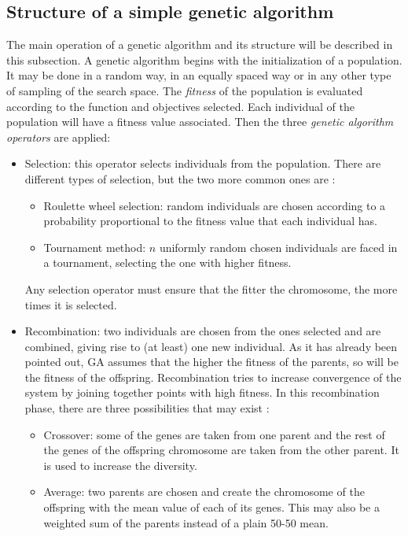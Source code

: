 \subsection{Structure of a simple genetic algorithm}
    
    The main operation of a genetic algorithm and its structure will be described in this subsection. A genetic algorithm begins with the initialization of a population. It may be done in a random way, in an equally spaced way or in any other type of sampling of the search space. The \textit{fitness} of the population is evaluated according to the function and objectives selected. Each individual of the population will have a fitness value associated. Then  the three \textit{genetic algorithm operators} are applied:
    
    \begin{itemize}
        \item Selection: this operator selects individuals from the population. There are different types of selection, but the two more common ones are \cite{zhong2005comparison}:
        \begin{itemize}
            \item Roulette wheel selection: random individuals are chosen according to a probability proportional to the fitness value that each individual has.
            \item Tournament method: $n$ uniformly random chosen individuals are faced in a tournament, selecting the one with higher fitness.
        \end{itemize}
        Any selection operator must ensure that the fitter the chromosome, the more times it is selected.
        \item Recombination: two individuals are chosen from the ones selected and are combined, giving rise to (at least) one new individual. As it has already been pointed out, GA assumes that the higher the fitness of the parents, so will be the fitness of the offspring. Recombination tries to increase convergence of the system by joining together points with high fitness. In this recombination phase, there are three possibilities that may exist \cite{thevenin2008and}:
        \begin{itemize}
            \item Crossover: some of the genes are taken from one parent and the rest of the genes of the offspring chromosome are taken from the other parent. It is used to increase the diversity.
            \item Average: two parents are chosen and create the chromosome of the offspring with the mean value of each of its genes. This may also be a weighted sum of the parents instead of a plain 50-50 mean.

\end{itemize}
\end{itemize}
